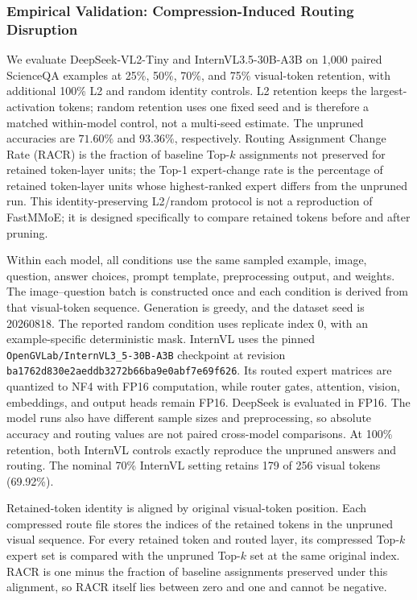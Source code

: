 \documentclass[10pt]{article}
\newenvironment{reviewchange}{\begingroup\color{red}}{\endgroup}
\begin{document}
\begin{reviewchange}
\subsubsection{Empirical Validation: Compression-Induced Routing Disruption}
\label{sec:interface_b-empirical}

We evaluate DeepSeek-VL2-Tiny and InternVL3.5-30B-A3B on 1,000 paired ScienceQA examples at 25\%, 50\%, 70\%,
and 75\% visual-token retention, with additional 100\% L2 and random identity controls.
L2 retention keeps the largest-activation tokens; random retention uses one
fixed seed and is therefore a matched within-model control, not a multi-seed estimate.
The unpruned accuracies are $71.60\%$ and $93.36\%$, respectively.  Routing Assignment
Change Rate (RACR) is the fraction of baseline Top-$k$ assignments not preserved for
retained token-layer units; the Top-1 expert-change rate is the percentage of retained
token-layer units whose highest-ranked expert differs from the unpruned run.
This identity-preserving L2/random protocol is not a reproduction of FastMMoE; it is
designed specifically to compare retained tokens before and after pruning.

Within each model, all conditions use the same sampled example, image, question, answer
choices, prompt template, preprocessing output, and weights.  The image--question batch
is constructed once and each condition is derived from that visual-token sequence.
Generation is greedy, and the dataset seed is 20260818.  The reported random condition
uses replicate index 0, with an example-specific deterministic mask.  InternVL uses the
pinned \texttt{OpenGVLab/InternVL3\_5-30B-A3B} checkpoint at revision
\texttt{ba1762d830e2aeddb3272b66ba9e0abf7e69f626}.  Its routed expert matrices are
quantized to NF4 with FP16 computation, while router gates, attention, vision,
embeddings, and output heads remain FP16.  DeepSeek is evaluated in FP16.  The model
runs also have different sample sizes and preprocessing, so absolute accuracy and
routing values are not paired cross-model comparisons.  At 100\% retention, both
InternVL controls exactly reproduce the unpruned answers and routing.  The nominal
70\% InternVL setting retains 179 of 256 visual tokens (69.92\%).

Retained-token identity is aligned by original visual-token position.  Each compressed
route file stores the indices of the retained tokens in the unpruned visual sequence.
For every retained token and routed layer, its compressed Top-$k$ expert set is compared
with the unpruned Top-$k$ set at the same original index.  RACR is one minus the fraction
of baseline assignments preserved under this alignment, so RACR itself lies between
zero and one and cannot be negative.


\end{reviewchange}
\end{document}
